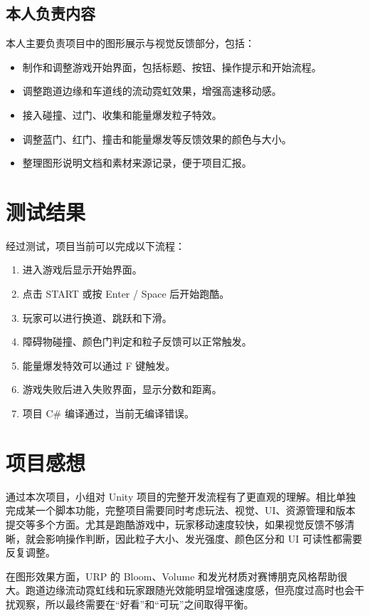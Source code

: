 \documentclass[UTF8,a4paper,12pt]{ctexart}
\begin{document}
\subsection{本人负责内容}

本人主要负责项目中的图形展示与视觉反馈部分，包括：

\begin{itemize}
  \item 制作和调整游戏开始界面，包括标题、按钮、操作提示和开始流程。
  \item 调整跑道边缘和车道线的流动霓虹效果，增强高速移动感。
  \item 接入碰撞、过门、收集和能量爆发粒子特效。
  \item 调整蓝门、红门、撞击和能量爆发等反馈效果的颜色与大小。
  \item 整理图形说明文档和素材来源记录，便于项目汇报。
\end{itemize}

\section{测试结果}

经过测试，项目当前可以完成以下流程：

\begin{enumerate}
  \item 进入游戏后显示开始界面。
  \item 点击 START 或按 Enter / Space 后开始跑酷。
  \item 玩家可以进行换道、跳跃和下滑。
  \item 障碍物碰撞、颜色门判定和粒子反馈可以正常触发。
  \item 能量爆发特效可以通过 F 键触发。
  \item 游戏失败后进入失败界面，显示分数和距离。
  \item 项目 C\# 编译通过，当前无编译错误。
\end{enumerate}

\section{项目感想}

通过本次项目，小组对 Unity 项目的完整开发流程有了更直观的理解。相比单独完成某一个脚本功能，完整项目需要同时考虑玩法、视觉、UI、资源管理和版本提交等多个方面。尤其是跑酷游戏中，玩家移动速度较快，如果视觉反馈不够清晰，就会影响操作判断，因此粒子大小、发光强度、颜色区分和 UI 可读性都需要反复调整。

在图形效果方面，URP 的 Bloom、Volume 和发光材质对赛博朋克风格帮助很大。跑道边缘流动霓虹线和玩家跟随光效能明显增强速度感，但亮度过高时也会干扰观察，所以最终需要在“好看”和“可玩”之间取得平衡。
\end{document}
